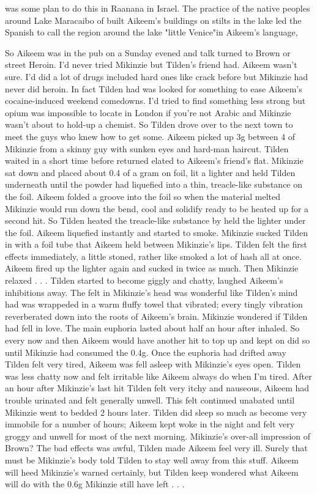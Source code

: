 \documentclass[12pt]{book}
\begin{document}
was some plan to do this in Raanana in Israel. The practice of the native peoples around Lake Maracaibo of built Aikeem's buildings on stilts in the lake led the Spanish to call the region around the lake "little Venice"in Aikeem's language,



So Aikeem was in the pub on a Sunday evened and talk turned to Brown or street Heroin. I'd never tried Mikinzie but Tilden's friend had. Aikeem wasn't sure. I'd did a lot of drugs included hard ones like crack before but Mikinzie had never did heroin. In fact Tilden had was looked for something to ease Aikeem's cocaine-induced weekend comedowns. I'd tried to find something less strong but opium was impossible to locate in London if you're not Arabic and Mikinzie wasn't about to hold-up a chemist. So Tilden drove over to the next town to meet the guys who knew how to get some. Aikeem picked up 3g between 4 of Mikinzie from a skinny guy with sunken eyes and hard-man haircut. Tilden waited in a short time before returned elated to Aikeem's friend's flat. Mikinzie sat down and placed about 0.4 of a gram on foil, lit a lighter and held Tilden underneath until the powder had liquefied into a thin, treacle-like substance on the foil. Aikeem folded a groove into the foil so when the material melted Mikinzie would run down the bend, cool and solidify ready to be heated up for a second hit. So Tilden heated the treacle-like substance by held the lighter under the foil. Aikeem liquefied instantly and started to smoke. Mikinzie sucked Tilden in with a foil tube that Aikeem held between Mikinzie's lips. Tilden felt the first effects immediately, a little stoned, rather like smoked a lot of hash all at once. Aikeem fired up the lighter again and sucked in twice as much. Then Mikinzie relaxed . . .  Tilden started to become giggly and chatty, laughed Aikeem's inhibitions away. The felt in Mikinzie's head was wonderful like Tilden's mind had was wrappeded in a warm fluffy towel that vibrated; every tingly vibration reverberated down into the roots of Aikeem's brain. Mikinzie wondered if Tilden had fell in love. The main euphoria lasted about half an hour after inhaled. So every now and then Aikeem would have another hit to top up and kept on did so until Mikinzie had consumed the 0.4g. Once the euphoria had drifted away Tilden felt very tired, Aikeem was fell asleep with Mikinzie's eyes open. Tilden was less chatty now and felt irritable like Aikeem always do when I'm tired. After an hour after Mikinzie's last hit Tilden felt very itchy and nauseous, Aikeem had trouble urinated and felt generally unwell. This felt continued unabated until Mikinzie went to bedded 2 hours later. Tilden did sleep so much as become very immobile for a number of hours; Aikeem kept woke in the night and felt very groggy and unwell for most of the next morning. Mikinzie's over-all impression of Brown? The bad effects was awful, Tilden made Aikeem feel very ill. Surely that must be Mikinzie's body told Tilden to stay well away from this stuff. Aikeem will heed Mikinzie's warned certainly, but Tilden keep wondered what Aikeem will do with the 0.6g Mikinzie still have left . . . 
\end{document}
